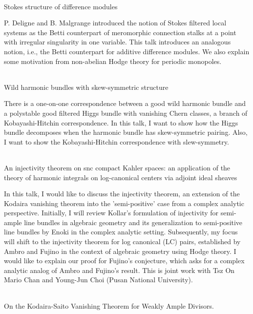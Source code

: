 \documentclass[dvipdfmx,a4paper,12pt]{article}
\theoremstyle{plain} %
\theoremstyle{definition} %
\begin{document}
\\
Stokes structure of difference modules

\vskip3mm
P. Deligne and B. Malgrange introduced the notion of Stokes filtered local systems as the Betti counterpart of meromorphic connection stalks at a point with irregular singularity in one variable. This talk introduces an analogous notion, i.e., the Betti counterpart for additive difference modules. We also explain some motivation from non-abelian Hodge theory for periodic monopoles.  
\vskip6mm

\\
Wild harmonic bundles with skew-symmetric structure 

\vskip3mm
There is a one-on-one correspondence between a good wild harmonic bundle and a polystable good filtered Higgs bundle with vanishing Chern classes, a branch of Kobayashi-Hitchin correspondence.  In this talk, I want to show how the  Higgs bundle decomposes when the harmonic bundle has skew-symmetric pairing. Also, I want to show the Kobayashi-Hitchin correspondence with slew-symmetry.
\vskip6mm

\\
An injectivity theorem on snc compact Kahler spaces:
an application of the theory of harmonic integrals on log-canonical centers via adjoint ideal sheaves


\vskip3mm
In this talk, I would like to discuss the injectivity theorem, an extension of the Kodaira vanishing theorem into the 'semi-positive' case from a complex analytic perspective.
Initially, I will review Kollar's formulation of injectivity for semi-ample line bundles in algebraic geometry and its generalization to semi-positive line bundles by Enoki in the complex analytic setting. 
Subsequently, my focus will shift to the injectivity theorem for log canonical (LC) pairs, established by Ambro and Fujino in the context of algebraic geometry using Hodge theory.
I would like to explain our proof for Fujino's conjecture, which asks for a complex analytic analog of Ambro and Fujino's result.
This is joint work with Tsz On Mario Chan and Young-Jun Choi (Pusan National University).
\vskip6mm


\newpage

\vskip3mm


\\
On the Kodaira-Saito Vanishing Theorem for Weakly Ample Divisors.
\end{document}
